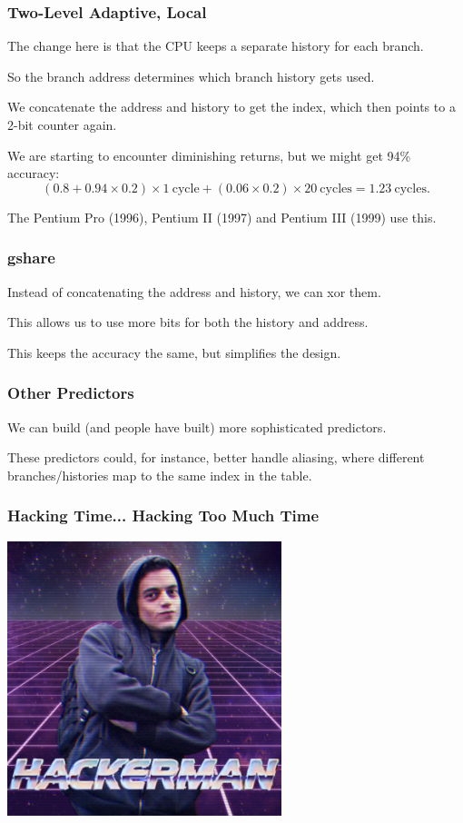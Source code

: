 \begin{frame}
\frametitle{Two-Level Adaptive, Local}


The change here is that the CPU keeps a separate history for each branch.


So the branch address determines which branch history gets used.


We concatenate the address and history to get the index, which then points to a
2-bit counter again. 

We are starting to encounter diminishing returns, but we might
get 94\% accuracy:
\[
(0.8 + 0.94 \times 0.2) \times 1 \mathrm{~cycle} + (0.06 \times 0.2) \times 20 \mathrm{~cycles} = 1.23 \mathrm{~cycles}.
\]

The Pentium Pro (1996), Pentium II (1997) and Pentium III (1999) use this.


\end{frame}



\begin{frame}
\frametitle{gshare}

Instead of concatenating the address and history, we can xor them. 

This allows
us to use more bits for both the history and address. 

This keeps the accuracy the same,
but simplifies the design.


\end{frame}



\begin{frame}
\frametitle{Other Predictors}

 We can build (and people have built) more sophisticated predictors.


These predictors could, for instance, better handle aliasing, where
different branches/histories map to the same index in the table.

\end{frame}


\begin{frame}
\frametitle{Hacking Time... Hacking Too Much Time}

\begin{center}
	\includegraphics[width=0.6\textwidth]{images/hackerman.png}
\end{center}

\end{frame}



